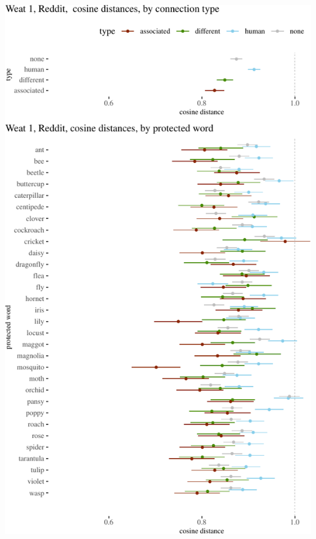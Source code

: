 \documentclass{clv3}
\begin{document}
\begin{center}\includegraphics[width=1\linewidth]{figures/resultsWeat1Reddita} \end{center}
\end{document}
